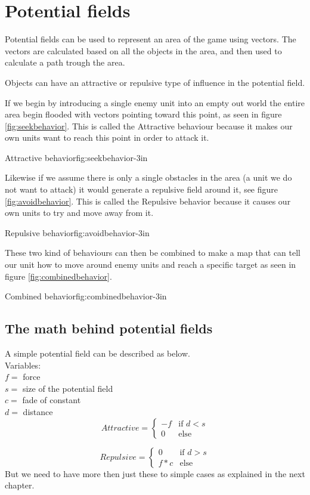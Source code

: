 \section{Potential fields}
	Potential fields can be used to represent an area of the game using vectors.  The vectors are calculated based on all the objects in the area, and then used to calculate a path trough the area.

	Objects can have an attractive or repulsive type of influence in the potential field.
	
If we begin by introducing a single enemy unit into an empty out world the entire area begin flooded with vectors pointing toward this point, as seen in figure \ref{fig:seekbehavior}. This is called the Attractive behaviour because it makes our own units want to reach this point in order to attack it.
	
		{Attractive behavior\cite{pft}}{fig:seekbehavior}{-3in}
	
	Likewise if we assume there is only a single obstacles in the area (a unit we do not want to attack) it would generate a repulsive field around it, see figure \ref{fig:avoidbehavior}. This is called the Repulsive behavior because it causes our own units to try and move away from it.

		{Repulsive behavior\cite{pft}}{fig:avoidbehavior}{-3in}
		
	These two kind of behaviours can then be combined to make a map that can tell our unit how to move around enemy units and reach a specific target as seen in figure \ref{fig:combinedbehavior}.
	
		{Combined behavior\cite{pft}}{fig:combinedbehavior}{-3in}
		
	\subsection{The math behind potential fields}
		A simple potential field can be described as below.\\
		
		Variables:\\
		$f =$ force\\
		$s =$ size of the potential field\\
		$c =$ fade of constant\\
		$d =$ distance\\
		\begin{displaymath}
			Attractive = \begin{cases}
					-f & \text{if $d < s$}\\
					0 & \text{else}
				\end{cases}		
		\end{displaymath}
			
		\begin{displaymath}
			Repulsive = \begin{cases}
					0 & \text{if $d > s$}\\
					f * c & \text{else}
				\end{cases}		
		\end{displaymath}
		But we need to have more then just these to simple cases as explained in the next chapter.
		
		